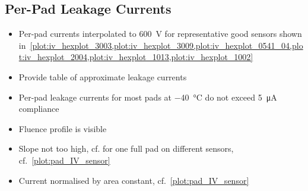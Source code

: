 \subsection{Per-Pad Leakage Currents}
\label{subsec:QA_Ipad}

\begin{itemize}
	\item Per-pad currents interpolated to \SI{600}{\volt} for representative good sensors shown in~\ref{plot:iv_hexplot_3003,plot:iv_hexplot_3009,plot:iv_hexplot_0541_04,plot:iv_hexplot_2004,plot:iv_hexplot_1013,plot:iv_hexplot_1002}
	\item Provide table of approximate leakage currents
	\item Per-pad leakage currents for most pads at \SI{-40}{\celsius} do not exceed \SI{5}{\micro\ampere} compliance
	\item Fluence profile is visible
	\item Slope not too high, cf. for one full pad on different sensors, cf.~\ref{plot:pad_IV_sensor}
	\item Current normalised by area constant, cf.~\ref{plot:pad_IV_sensor}
\end{itemize}

